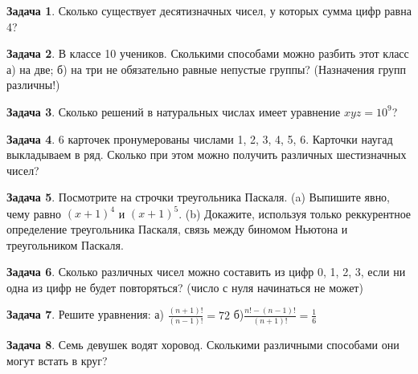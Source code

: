 \documentclass[a4paper,11pt]{article}%
\theoremstyle{definition}%
\newtheorem{Ex}{\hspace{-25pt}\fbox{\phantom{123}} Задача}%
\begin{document}
%
\iffalse%
Автор: 25 школа%
Дата: 2017%
Название: %
Подсказка: \textbackslash{}\textbackslash{}%
nan%
\fi%
%
\begin{Ex}%
Сколько существует десятизначных чисел, у которых сумма цифр равна 4?%
%
\end{Ex}%
%
\iffalse%
Автор: 25 школа%
Дата: 2017%
Название: %
Подсказка: \textbackslash{}\textbackslash{}%
nan%
\fi%
%
\begin{Ex}%
В классе 10 учеников. Сколькими способами можно разбить этот класс а)
на две; б) на три не обязательно равные непустые группы? (Назначения
групп различны!)%
%
\end{Ex}%
%
\iffalse%
Автор: 25 школа%
Дата: 2012%
Название: %
Подсказка: \textbackslash{}\textbackslash{}%
nan%
\fi%
%
\begin{Ex}%
Сколько решений в натуральных числах имеет уравнение $x y z=10^{9}$?%
%
\end{Ex}%
%
\iffalse%
Автор: Дмитрий Трущин%
Дата: 2013%
Название: %
Подсказка: \textbackslash{}\textbackslash{}%
nan%
\fi%
%
\begin{Ex}%
6 карточек пронумерованы числами 1, 2, 3, 4, 5, 6.
Карточки наугад выкладываем в ряд. Сколько при этом можно получить
различных шестизначных чисел?%
%
\end{Ex}%
%
\iffalse%
Автор: Дарья Анзон%
Дата: 2017%
Название: %
Подсказка: \textbackslash{}\textbackslash{}%
nan%
\fi%
%
\begin{Ex}%
Посмотрите на строчки треугольника Паскаля.
(a) Выпишите явно, чему равно $(x + 1)^4$ и $(x + 1)^5$.
(b) Докажите, используя только реккурентное определение треугольника Паскаля, связь между биномом Ньютона и треугольником Паскаля.%
%
\end{Ex}%
%
\iffalse%
Автор: Павел Минаев%
Дата: 2017%
Название: %
Подсказка: \textbackslash{}\textbackslash{}%
nan%
\fi%
%
\begin{Ex}%
Сколько различных чисел можно составить из цифр 0, 1, 2, 3, если ни одна из
цифр не будет повторяться? (число с нуля начинаться не может)%
%
\end{Ex}%
%
\iffalse%
Автор: Дарья Анзон%
Дата: 2017%
Название: %
Подсказка: \textbackslash{}\textbackslash{}%
nan%
\fi%
%
\begin{Ex}%
Решите уравнения: а) $\frac{(n+1) !}{(n-1) !}=72$ б)$\frac{n !-(n-1) !}{(n+1) !}=\frac{1}{6}$%
%
\end{Ex}%
%
\iffalse%
Автор: Дарья Анзон%
Дата: 2017%
Название: %
Подсказка: \textbackslash{}\textbackslash{}%
nan%
\fi%
%
\begin{Ex}%
Семь девушек водят хоровод. Сколькими различными способами они могут
встать в круг?%
%
\end{Ex}%
\end{document}
